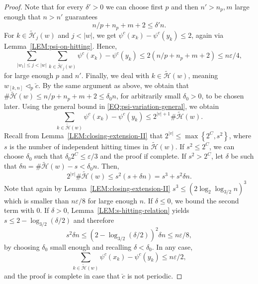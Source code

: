 \documentclass[11pt,reqno]{amsart}
\theoremstyle{plain}
\theoremstyle{definition}
\newcommand{\mc}{\mathcal}
\begin{document}
\begin{proof}
Note that for every $\delta'>0$ we can choose first $p$ and then $n' > n_p,m$ large enough that $n>n'$ guarantees
\[
n/p + n_p + m + 2\leqslant \delta' n.
\]
For $k \in \widetilde{\mc H}_j(w)$ and $j < |w|$, we get $\psi^c(x_k) - \psi^c(y_k) \leqslant 2$, again via Lemma~\ref{LEM:psi-on-hitting}. Hence,
\[
\sum_{|w_1| \leqslant j < |w|} \sum_{k \in \widetilde{\mc H}_j(w)} \psi^c(x_k) - \psi^c(y_k) \leqslant 2 (n/p + n_p + m + 2) \leqslant n \varepsilon/4,
\]
for large enough $p$ and $n'$. 
Finally, we deal with $k \in \widetilde{\mc H}(w)$, meaning $w_{[k,n]} \triangleleft_p \breve{c}$. By the same argument as above, we obtain that $\# \widetilde{\mc H}(w) \leqslant n/p + n_p + m + 2 \leqslant \delta_0 n$, for arbitrarily small $\delta_0>0$, to be chosen later. 
Using the general bound in \eqref{EQ:psi-variation-general}, we obtain
\[
\sum_{k \in \widetilde{\mc H}(w)} \psi^c(x_k) - \psi^c(y_k) \leqslant 2^{|v| +1} \# \widetilde{\mc H}(w).
\]
Recall from Lemma~\ref{LEM:closing-extension-II} that $2^{|v|} \leqslant \max\left\{2^C, s^2\right\}$, where $s$ is the number of independent hitting times in $\widetilde{\mc H}(w)$.
If $s^2 \leqslant 2^C$, we can choose $\delta_0$ such that $\delta_0 2^C \leqslant \varepsilon /3$ and the proof if complete. If $s^2 > 2^C$, let $\delta$ be such that $\delta n = \# \widetilde{\mc H}(w) - s < \delta_0 n$. Then,
\[
2^{|v|} \# \widetilde{\mc H}(w)
\leqslant s^2 (s+ \delta n) = s^3 + s^2 \delta n.
\]
Note that again by Lemma~\ref{LEM:closing-extension-II} $s^3 \leqslant (2 \log_2 \log_{3/2} n)^3$ which is smaller than $n \varepsilon/8$ for large enough $n$. If $\delta \leqslant 0$, we bound the second term with $0$. 
If $\delta>0$, Lemma~\ref{LEM:s-hitting-relation} yields $s \leqslant 2 - \log_{3/2}(\delta/2)$ 
and therefore
\[
s^2 \delta n \leqslant  (2- \log_{3/2}(\delta/2) )^2 \delta n \leqslant n \varepsilon/8,
\]
by choosing $\delta_0$ small enough and recalling $\delta < \delta_0$. In any case,
\[
\sum_{k \in \widetilde{\mc H}(w)} \psi^c(x_k) - \psi^c(y_k) \leqslant n \varepsilon/2,
\]
and the proof is complete in case that $\breve{c}$ is not periodic.


\end{proof}
\end{document}
